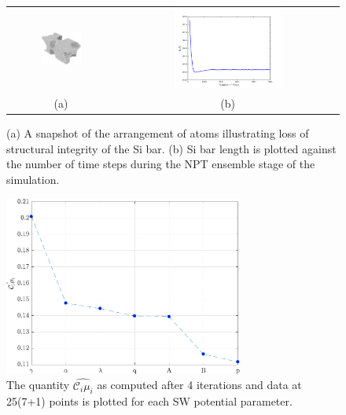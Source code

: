 \begin{figure}[p]
\begin{center}
\begin{tabular}{cc}
  \includegraphics[width=0.40\textwidth]{./Figures/unstable}
  &
  \hspace{3mm}
  \includegraphics[width=0.50\textwidth]{./Figures/lx_npt}
  \\ (a) & (b)
  \end{tabular}
\caption{(a) A snapshot of the arrangement of atoms illustrating loss of
structural integrity of the Si bar. 
(b) Si bar length is plotted against the number of time steps during
the NPT ensemble stage of the simulation.}
\label{fig:dgsm1}
\end{center}
\end{figure}

\clearpage


\begin{figure}[p]
 \begin{center}
  \includegraphics[width=0.70\textwidth]{./Figures/ub}
\caption{The quantity $\hat{\mathcal{C}_i\mu_i}$ as computed after 4 iterations and data at 25(7+1)
points is plotted for each SW potential parameter.}
\label{fig:ub}
\end{center}
\end{figure}

